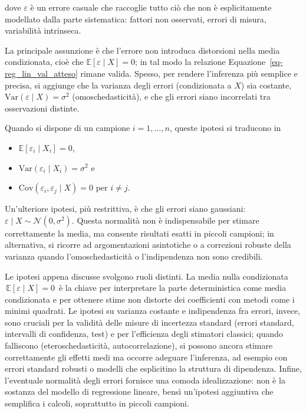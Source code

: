 \documentclass[
  italian,
  a4paper,
  a4paper,
  twoside,
  open=right,
  12pt]{scrbook}
\theoremstyle{definition}
\theoremstyle{remark}
\begin{document}
dove \(\varepsilon\) è un errore casuale che raccoglie tutto ciò che non
è esplicitamente modellato dalla parte sistematica: fattori non
osservati, errori di misura, variabilità intrinseca.

La principale assunzione è che l'errore non introduca distorsioni nella
media condizionata, cioè che \(\mathbb{E}[\varepsilon \mid X] = 0\); in
tal modo la relazione Equazione~\ref{eq-reg_lin_val_atteso} rimane
valida. Spesso, per rendere l'inferenza più semplice e precisa, si
aggiunge che la varianza degli errori (condizionata a \(X\)) sia
costante, \(\mathrm{Var}(\varepsilon \mid X) = \sigma^2\)
(omoschedasticità), e che gli errori siano incorrelati tra osservazioni
distinte.

Quando si dispone di un campione \(i=1,\dots,n\), queste ipotesi si
traducono in

\begin{itemize}
\item
  \(\mathbb{E}[\varepsilon_i \mid X_i]=0\),
\item
  \(\mathrm{Var}(\varepsilon_i \mid X_i)=\sigma^2\) e
\item
  \(\mathrm{Cov}(\varepsilon_i,\varepsilon_j \mid X)=0\) per
  \(i\neq j\).
\end{itemize}

Un'ulteriore ipotesi, più restrittiva, è che gli errori siano gaussiani:
\(\varepsilon \mid X \sim \mathcal{N}(0,\sigma^2)\). Questa normalità
non è indispensabile per stimare correttamente la media, ma consente
risultati esatti in piccoli campioni; in alternativa, si ricorre ad
argomentazioni asintotiche o a correzioni robuste della varianza quando
l'omoschedasticità o l'indipendenza non sono credibili.

Le ipotesi appena discusse svolgono ruoli distinti. La media nulla
condizionata \(\,\mathbb{E}[\varepsilon \mid X]=0\,\) è la chiave per
interpretare la parte deterministica come media condizionata e per
ottenere stime non distorte dei coefficienti con metodi come i minimi
quadrati. Le ipotesi su varianza costante e indipendenza fra errori,
invece, sono cruciali per la validità delle misure di incertezza
standard (errori standard, intervalli di confidenza, test) e per
l'efficienza degli stimatori classici; quando falliscono
(eteroschedasticità, autocorrelazione), si possono ancora stimare
correttamente gli effetti medi ma occorre adeguare l'inferenza, ad
esempio con errori standard robusti o modelli che esplicitino la
struttura di dipendenza. Infine, l'eventuale normalità degli errori
fornisce una comoda idealizzazione: non è la sostanza del modello di
regressione lineare, bensì un'ipotesi aggiuntiva che semplifica i
calcoli, soprattutto in piccoli campioni.
\end{document}
